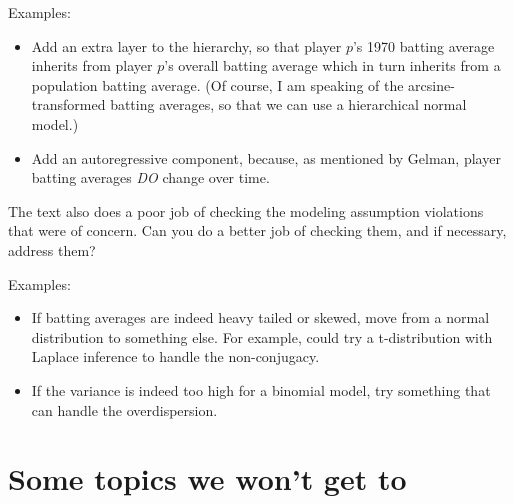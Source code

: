 \documentclass{article} %
\begin{document}
Examples:
\begin{itemize}
\item Add an extra layer to the hierarchy,  so that player $p$'s 1970 batting average inherits from player $p$'s overall batting average which in turn inherits from a population batting average.  (Of course,  I am speaking of the arcsine-transformed batting averages,  so that we can use a hierarchical normal model.)
\item Add an autoregressive component, because,  as mentioned by Gelman,  player batting averages \textit{DO} change over time. 
\end{itemize}

The text also does a poor job of checking the modeling assumption violations that were of concern.   Can you do a better job of checking them,  and if necessary,  address them?

Examples:
\begin{itemize}
\item If batting averages are indeed heavy tailed or skewed,  move from a normal distribution to something else.   For example,  could try a t-distribution with Laplace inference to handle the non-conjugacy. 
\item If the variance is indeed too high for a binomial model,  try something that can handle the overdispersion. 
\end{itemize}

\section{Some topics we won't get to}
\end{document}
